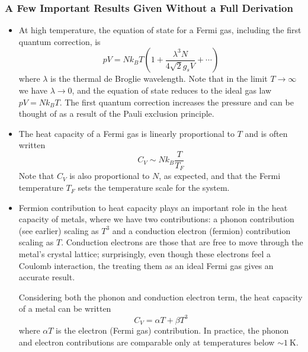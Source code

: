 \documentclass[11pt, a4paper]{article}
\begin{document}
\subsubsection{A Few Important Results Given Without a Full Derivation}
\begin{itemize}
	\item At high temperature, the equation of state for a Fermi gas, including the first quantum correction, is
	\begin{equation*}
		pV = Nk_{B}T\left(1 + \frac{\lambda^{3}N}{4\sqrt{2}g_{s}V} + \cdots \right)
	\end{equation*}
	where $ \lambda $ is the thermal de Broglie wavelength.	Note that in the limit $ T \to \infty $ we have $ \lambda \to 0 $, and the equation of state reduces to the ideal gas law $ pV = Nk_{B}T $. The first quantum correction increases the pressure and can be thought of as a result of the Pauli exclusion principle.
	
	\item The heat capacity of a Fermi gas is linearly proportional to $ T $ and is often written
	\begin{equation*}
		C_{V} \sim N k_{B} \frac{T}{T_{F}}
	\end{equation*}
	Note that $ C_{V} $ is also proportional to $ N $, as expected, and that the Fermi temperature $ T_{F} $ sets the temperature scale for the system. 
	
	\item Fermion contribution to heat capacity plays an important role in the heat capacity of metals, where we have two contributions: a phonon contribution (see earlier) scaling as $ T^{3} $ and a conduction electron (fermion) contribution scaling as $ T $. Conduction electrons are those that are free to move through the metal's crystal lattice; surprisingly, even though these electrons feel a Coulomb interaction, the treating them as an ideal Fermi gas gives an accurate result. 
	
	Considering both the phonon and conduction electron term, the heat capacity of a metal can be written
	\begin{equation*}
		C_{V} = \alpha T + \beta T^{3}
	\end{equation*}
	where $ \alpha T $ is the electron (Fermi gas) contribution. In practice, the phonon and electron contributions are comparable only at temperatures below $ \sim \SI{1}{\kelvin} $.
	

\end{itemize}
\end{document}
